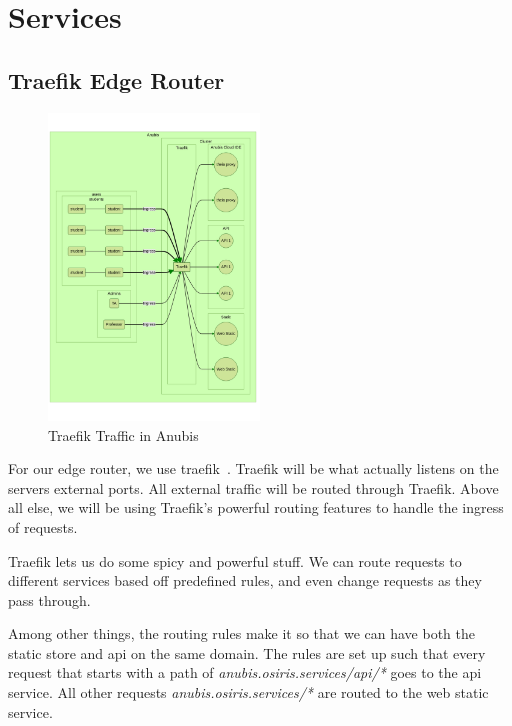 \chapter{Services}\label{ch:services}


\section{Traefik Edge Router}\label{sec:traefik}

\begin{figure}[ht]
    \centering
    \includegraphics[width=0.5\textwidth]{figures/traefik.mmd}
    \caption{Traefik Traffic in Anubis\label{fig:traefik}}
\end{figure}

For our edge router, we use traefik~.
Traefik will be what actually listens on the servers external ports.
All external traffic will be routed through Traefik.
Above all else, we will be using Traefik's powerful routing features to handle the ingress of requests.

Traefik lets us do some spicy and powerful stuff.
We can route requests to different services based off predefined rules,
and even change requests as they pass through.

Among other things, the routing rules make it so that we can have
both the static store and api on the same domain.
The rules are set up such that every request that
starts with a path of \textit{anubis.osiris.services/api/*} goes to the api~ service.
All other requests \textit{anubis.osiris.services/*} are routed to the web static~ service.

